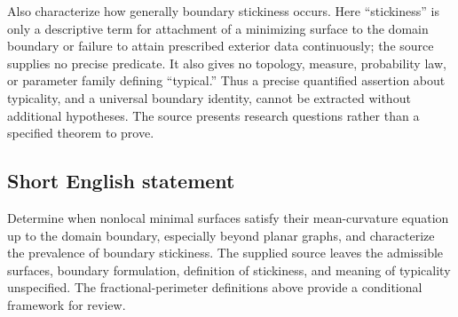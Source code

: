 \documentclass[11pt]{article}
\begin{document}
Also characterize how generally boundary stickiness occurs. Here ``stickiness'' is only a descriptive term for attachment of a minimizing surface to the domain boundary or failure to attain prescribed exterior data continuously; the source supplies no precise predicate. It also gives no topology, measure, probability law, or parameter family defining ``typical.'' Thus a precise quantified assertion about typicality, and a universal boundary identity, cannot be extracted without additional hypotheses. The source presents research questions rather than a specified theorem to prove.
\subsection{Short English statement}
Determine when nonlocal minimal surfaces satisfy their mean-curvature equation up to the domain boundary, especially beyond planar graphs, and characterize the prevalence of boundary stickiness. The supplied source leaves the admissible surfaces, boundary formulation, definition of stickiness, and meaning of typicality unspecified. The fractional-perimeter definitions above provide a conditional framework for review.
\end{document}
